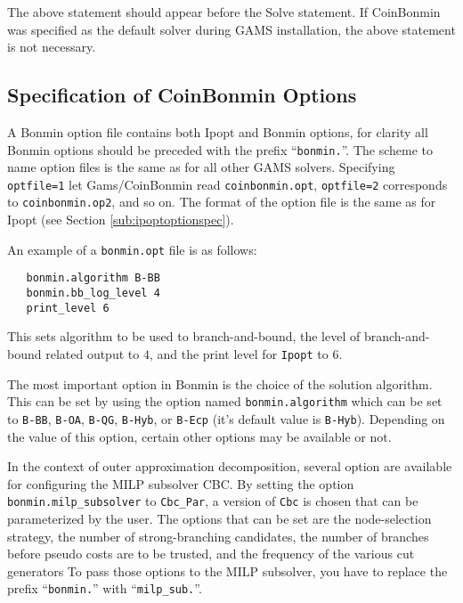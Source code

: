 The above statement should appear before the Solve statement.
If CoinBonmin was specified as the default solver during GAMS installation, the above statement is not necessary.

\subsection{Specification of CoinBonmin Options}
\label{sub:bonminoptionspec}

A Bonmin option file contains both Ipopt and Bonmin options, for clarity all Bonmin options should be preceded with the prefix ``\texttt{bonmin.}''.
The scheme to name option files is the same as for all other GAMS solvers.
Specifying \texttt{optfile=1} let Gams/CoinBonmin read \texttt{coinbonmin.opt}, \texttt{optfile=2} corresponds to \texttt{coinbonmin.op2}, and so on.
The format of the option file is the same as for Ipopt (see Section \ref{sub:ipoptoptionspec}).

An example of a \texttt{bonmin.opt} file is as follows:
\begin{verbatim}
   bonmin.algorithm B-BB
   bonmin.bb_log_level 4
   print_level 6
\end{verbatim}
This sets algorithm to be used to branch-and-bound, the level of branch-and-bound related output to $4$, and the print level for \texttt{Ipopt} to $6$.

The most important option in Bonmin is the choice of the solution algorithm.
This can be set by using the option named \texttt{bonmin.algorithm} which can be set to \texttt{B-BB}, \texttt{B-OA}, \texttt{B-QG}, \texttt{B-Hyb}, or \texttt{B-Ecp} (it's default value is \texttt{B-Hyb}).
Depending on the value of this option, certain other options may be available or not.

In the context of outer approximation decomposition, several option are available for configuring the MILP subsolver CBC.
By setting the option \texttt{bonmin.milp\_subsolver} to \texttt{Cbc\_Par}, a version of \texttt{Cbc} is chosen that can be parameterized by the user.
The options that can be set are the node-selection strategy, the number of strong-branching candidates,
the number of branches before pseudo costs are to be trusted, and the frequency of the various cut generators
To pass those options to the MILP subsolver, you have to replace the prefix ``\texttt{bonmin.}'' with ``\texttt{milp\_sub.}''.

